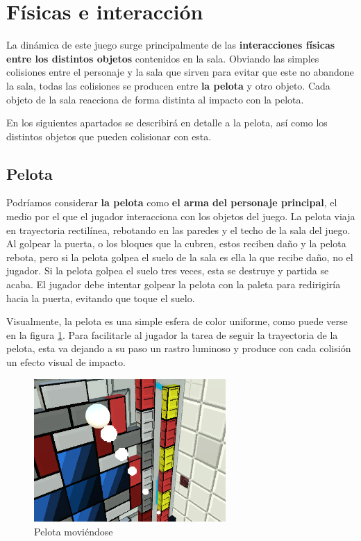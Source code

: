 \section{Físicas e interacción}
La dinámica de este juego surge principalmente de las \textbf{interacciones físicas entre los distintos objetos} contenidos en la sala. Obviando las simples colisiones entre el personaje y la sala que sirven para evitar que este no abandone la sala, todas las colisiones se producen entre \textbf{la pelota} y otro objeto. Cada objeto de la sala reacciona de forma distinta al impacto con la pelota.

En los siguientes apartados se describirá en detalle a la pelota, así como los distintos objetos que pueden colisionar con esta.

\subsection{Pelota}
Podríamos considerar \textbf{la pelota} como \textbf{el arma del personaje principal}, el medio por el que el jugador interacciona con los objetos del juego. La pelota viaja en trayectoria rectilínea, rebotando en las paredes y el techo de la sala del juego. Al golpear la puerta, o los bloques que la cubren, estos reciben daño y la pelota rebota, pero si la pelota golpea el suelo de la sala es ella la que recibe daño, no el jugador. Si la pelota golpea el suelo tres veces, esta se destruye y partida se acaba. El jugador debe intentar golpear la pelota con la paleta para redirigiría hacia la puerta, evitando que toque el suelo.

Visualmente, la pelota es una simple esfera de color uniforme, como puede verse en la figura \ref{ball}. Para facilitarle al jugador la tarea de seguir la trayectoria de la pelota, esta va dejando a su paso un rastro luminoso y produce con cada colisión un efecto visual de impacto.
\begin{figure}[h]
	\includegraphics[width=0.65\textwidth]{images/estructura/fisica/ball_moving}
	\centering
	\caption{Pelota moviéndose}
	\label{ball}
\end{figure}

